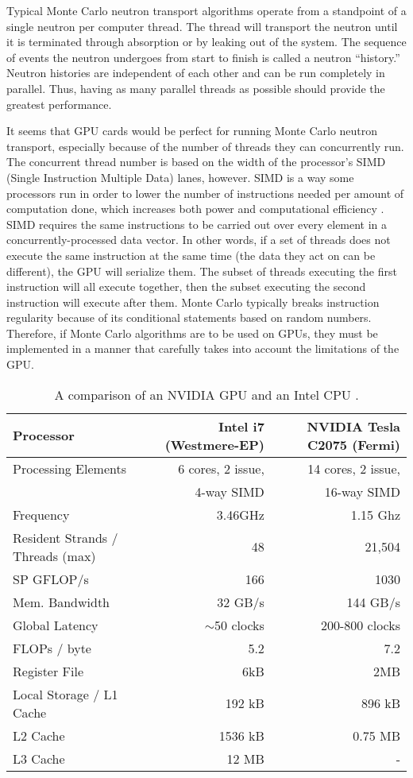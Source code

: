 Typical Monte Carlo neutron transport algorithms operate from a standpoint of a single neutron per computer thread.  The thread will transport the neutron until it is terminated through absorption or by leaking out of the system.  The sequence of events the neutron undergoes from start to finish is called a neutron ``history.''  Neutron histories are independent of each other and can be run completely in parallel.  Thus, having as many parallel threads as possible should provide the greatest performance.  

It seems that GPU cards would be perfect for running Monte Carlo neutron transport, especially because of the number of threads they can concurrently run.  The concurrent thread number is based on the width of the processor's SIMD (Single Instruction Multiple Data) lanes, however.  SIMD is a way some processors run in order to lower the number of instructions needed per amount of computation done, which increases both power and computational efficiency \cite{simd_power}.  SIMD requires the same instructions to be carried out over every element  in a concurrently-processed data vector.  In other words, if a set of threads does not execute the same instruction at the same time (the data they act on can be different), the GPU will serialize them.  The subset of threads executing the first instruction will all execute together, then the subset executing the second instruction will execute after them.  Monte Carlo typically breaks instruction regularity because of its conditional statements based on random numbers.  Therefore, if Monte Carlo algorithms are to be used on GPUs, they must be implemented in a manner that carefully takes into account the limitations of the GPU.

\begin{table}[h]
\centering
\caption[A comparison of an NVIDIA GPU and an Intel CPU]{A comparison of an NVIDIA GPU and an Intel CPU \cite{cent, cpu_latency,opteronperformance}.}
\label{gpu_cpu_comp}
\begin{tabular}{| l | r | r |}
\hline
Processor & Intel i7 (Westmere-EP) & NVIDIA Tesla C2075 (Fermi) \\
\hline
\hline
Processing Elements & 6 cores, 2 issue, & 14 cores, 2 issue, \\
& 4-way SIMD &  16-way SIMD  \\
\hline
Frequency & 3.46GHz &  1.15 Ghz \\
\hline
Resident Strands / Threads (max) & 48 & 21,504 \\
\hline
SP GFLOP/s & 166 & 1030 \\
\hline
Mem. Bandwidth &  32 GB/s & 144 GB/s \\
\hline
Global Latency & $\sim$50 clocks & 200-800 clocks  \\
\hline
FLOPs / byte & 5.2  & 7.2 \\
\hline
Register File & 6kB & 2MB \\
\hline
Local Storage / L1 Cache & 192 kB & 896 kB \\
\hline
L2 Cache & 1536 kB & 0.75 MB \\
\hline
L3 Cache & 12 MB & - \\
\hline
\end{tabular}
\end{table}

